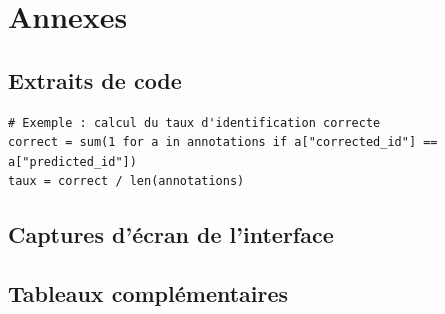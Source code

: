 \documentclass[11pt,a4paper]{report}
\begin{document}
\appendix
\chapter{Annexes}

\section{Extraits de code}
\begin{lstlisting}
# Exemple : calcul du taux d'identification correcte
correct = sum(1 for a in annotations if a["corrected_id"] == a["predicted_id"])
taux = correct / len(annotations)
\end{lstlisting}

\section{Captures d'écran de l'interface}

\section{Tableaux complémentaires}
\end{document}

